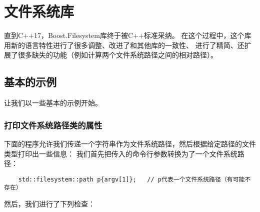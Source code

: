 \chapter{文件系统库}\label{ch20}
直到C++17，Boost.Filesystem库终于被C++标准采纳。
在这个过程中，这个库用新的语言特性进行了很多调整、改进了和其他库的一致性、
进行了精简、还扩展了很多缺失的功能（例如计算两个文件系统路径之间的相对路径）。


\section{基本的示例}
让我们以一些基本的示例开始。

\subsection{打印文件系统路径类的属性}
下面的程序允许我们传递一个字符串作为文件系统路径，然后根据给定路径的文件类型打印出一些信息：
我们首先把传入的命令行参数转换为了一个文件系统路径：
\begin{lstlisting}
    std::filesystem::path p{argv[1]};   // p代表一个文件系统路径（有可能不存在）
\end{lstlisting}
然后，我们进行了下列检查：
